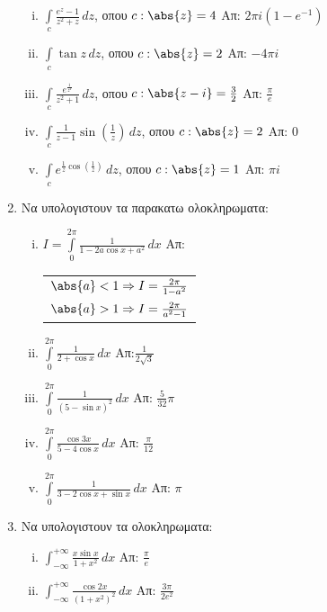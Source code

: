 \begin{enumerate}
\begin{enumerate}[i)]
\item $\int\limits_c\frac{e^z-1}{z^2+z}\,dz$, οπου $c:\abs{z}=4$ \hfill Απ: $2\pi i(1-e^{-1})$

\item $\int\limits_c\tan z\,dz$, οπου $c:\abs{z}=2$ \hfill Απ: $-4\pi i$

\item $\int\limits_c\frac{e^{\frac{1}{z^2}}}{z^2+1}\,dz$, οπου $c:\abs{z-i}=\frac{3}{2}$ \hfill Απ: $\frac{\pi}{e}$

\item $\int\limits_c\frac{1}{z-1}\sin(\frac{1}{z})\,dz$, οπου $c:\abs{z}=2$ \hfill Απ: $0$

\item $\int\limits_c e^{\frac{1}{z}\cos(\frac{1}{z})}\,dz$, οπου $c:\abs{z}=1$ \hfill Απ: $\pi i$

\end{enumerate}

\item Να υπολογιστουν τα παρακατω ολοκληρωματα:

\begin{enumerate}[i)]

\item $I=\int\limits_0^{2\pi}\frac{1}{1-2a\cos x+a^2}\,dx$ \hfill Απ: \begin{tabular}{c}$\abs{a}<1\Rightarrow I=\frac{2\pi}{1-a^2}$ \\ $\abs{a}>1\Rightarrow I=\frac{2\pi}{a^2-1}$\end{tabular}

\item $\int\limits_0^{2\pi}\frac{1}{2+\cos x}\,dx$ \hfill Απ:$\frac{1}{2\sqrt{3}}$

\item $\int\limits_0^{2\pi}\frac{1}{(5-\sin x)^2}\,dx$ \hfill Απ: $\frac{5}{32}\pi$

\item $\int\limits_0^{2\pi}\frac{\cos 3x}{5-4\cos x}\,dx$ \hfill Απ: $\frac{\pi}{12}$

\item $\int\limits_0^{2\pi}\frac{1}{3-2\cos x+\sin x}\,dx$ \hfill Απ: $\pi$
\end{enumerate}

\item Να υπολογιστουν τα ολοκληρωματα:

\begin{enumerate}[i)]

\item $\int_{-\infty}^{+\infty}\frac{x\sin x}{1+x^2}\,dx$ \hfill  Απ: $\frac{\pi}{e}$

\item $\int_{-\infty}^{+\infty}\frac{\cos 2x}{(1+x^2)^2}\,dx$ \hfill  Απ: $\frac{3\pi}{2e^2}$

\end{enumerate}

\end{enumerate}

